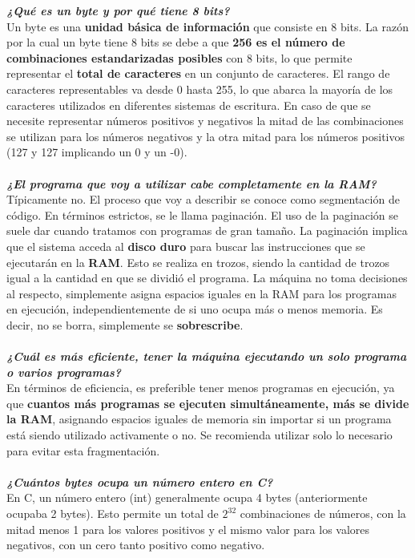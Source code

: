 \documentclass{templateNote}
\begin{document}
\noindent \textit{\textbf{¿Qué es un byte y por qué tiene 8 bits?}} \\
Un byte es una \textbf{unidad básica de información} que consiste en 8 bits. La razón por la cual un byte tiene 8 bits se debe a que 
\textbf{256 es el número de combinaciones estandarizadas posibles} con 8 bits, lo que permite representar el \textbf{total de caracteres} en 
un conjunto de caracteres. El rango de caracteres representables va desde 0 hasta 255, lo que abarca la mayoría de los caracteres 
utilizados en diferentes sistemas de escritura. En caso de que se necesite representar números positivos y negativos la mitad de 
las combinaciones se utilizan para los números negativos y la otra mitad para los números positivos (127 y 127 implicando un 0 y un -0).
\\\\
\noindent \textit{\textbf{¿El programa que voy a utilizar cabe completamente en la RAM?}} \\
Típicamente no. El proceso que voy a describir se conoce como segmentación de código. En términos estrictos, se le llama paginación. 
El uso de la paginación se suele dar cuando tratamos con programas de gran tamaño.
La paginación implica que el sistema acceda al \textbf{disco duro} para buscar las instrucciones que se ejecutarán en la \textbf{RAM}. Esto se realiza 
en trozos, siendo la cantidad de trozos igual a la cantidad en que se dividió el programa. La máquina no toma decisiones al respecto, 
simplemente asigna espacios iguales en la RAM para los programas en ejecución, independientemente de si uno ocupa más o menos memoria. 
Es decir, no se borra, simplemente se \textbf{sobrescribe}.
\\\\
\noindent \textit{\textbf{¿Cuál es más eficiente, tener la máquina ejecutando un solo programa o varios programas?}}\\
En términos de eficiencia, es preferible tener menos programas en ejecución, ya que \textbf{cuantos más programas se ejecuten simultáneamente, más se divide la RAM}, 
asignando espacios iguales de memoria sin importar si un programa está siendo utilizado activamente o no. Se recomienda utilizar solo lo necesario para evitar
esta fragmentación.
\\\\
\noindent \textit{\textbf{¿Cuántos bytes ocupa un número entero en C?}}\\
En C, un número entero (int) generalmente ocupa 4 bytes (anteriormente ocupaba 2 bytes). Esto permite un total de $2^{32}$ combinaciones de números, con la mitad 
menos 1 para los valores positivos y el mismo valor para los valores negativos, con un cero tanto positivo como negativo.
\end{document}
